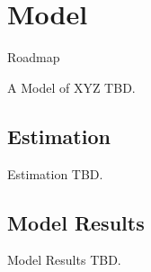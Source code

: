\section{Model}
\begin{frame}[noframenumbering,c]{Roadmap}
	\tableofcontents[currentsection]
\end{frame}

\begin{frame}{A Model of XYZ}	
	TBD. 	
\end{frame}

\subsection{Estimation}

\begin{frame}{Estimation}
	TBD. 	
\end{frame}

\subsection{Model Results}

\begin{frame}{Model Results}
	TBD. 	
\end{frame}